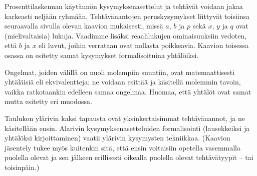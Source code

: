 Prosenttilaskennan käytännön kysymyksenasettelut ja tehtävät voidaan jakaa karkeasti neljään ryhmään. Tehtävänantojen peruskysymykset liittyvät toisiinsa seuraavalla sivulla olevan kaavion mukaisesti, missä $a$, $b$ ja $p$ sekä $x$, $y$ ja $q$ ovat (mielivaltaisia) lukuja. Vaadimme lisäksi reaalilukujen ominaisuuksiin vedoten, että $b$ ja $x$ eli luvut, joihin verrataan ovat nollasta poikkeavia. Kaavion toisessa osassa on esitetty samat kysymykset formalisoituina yhtälöiksi.
\newpage
{}

Ongelmat, joiden välillä on nuoli molempiin suuntiin, ovat matemaattisesti yhtäläisiä eli ekvivalentteja; ne voidaan esittää ja käsitellä molemmin tavoin, vaikka ratkotaankin edelleen samaa ongelmaa. Huomaa, että yhtälöt ovat samat mutta esitetty eri muodossa.

Taulukon ylärivin kaksi tapausta ovat yksinkertaisimmat tehtävänannot, ja ne käsitellään ensin. Alarivin kysymyksenasetteluiden formalisointi (lausekkeiksi ja yhtälöksi kirjoittaminen) vaatii ylärivin kysymysten tekniikkaa. (Kaavion jäsentely tukee myös kuitenkin sitä, että ensin voitaisiin opetella vasemmalla puolella olevat ja sen jälkeen erillisesti oikealla puolella olevat tehtävätyypit -- tai toisinpäin.)

